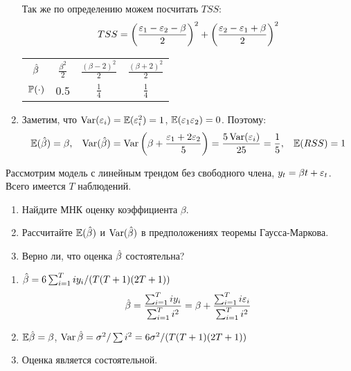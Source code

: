 \begin{problem}
\begin{sol}
\begin{enumerate}
Так же по определению можем посчитать $TSS$:
\[
TSS = \left( \frac{\e_1 -\e_2-\beta}{2} \right)^2 + \left( \frac{\e_2 -\e_1+\beta}{2} \right)^2
\]

\begin{center}
\begin{tabular}{c|ccc}
\toprule
$\hb$ & $ \frac{\beta^2}{2}$ & $\frac{(\beta-2)^2}{2}$ & $\frac{(\beta+2)^2}{2}$\\
$\P(\cdot)$ & 0.5  & $\frac{1}{4}$ & $\frac{1}{4}$\\
\bottomrule
\end{tabular}
\end{center}

\item
Заметим, что $\Var(\e_i) = \E(\e_i^2) = 1$, $\E(\e_1\e_2) = 0$. Поэтому:
\[
\E(\hb) = \beta, \hspace{3mm} \Var(\hb) = \Var\left(\beta + \frac{\e_1 + 2\e_2}{5} \right) = \frac{5\Var(\e_i)}{25} = \frac{1}{5}, \hspace{3mm} \E(RSS) = 1
\]


\end{enumerate}
\end{sol}
\end{problem}




\begin{problem}
Рассмотрим модель с линейным трендом без свободного члена, $y_t=\beta t +\e_t$. Всего имеется $T$ наблюдений.
\begin{enumerate}
\item Найдите МНК оценку коэффициента $\beta$.
\item Рассчитайте $\E(\hb)$ и $\Var(\hb)$ в предположениях теоремы Гаусса-Маркова.
\item Верно ли, что оценка $\hb$ состоятельна?
\end{enumerate}



\begin{sol}
\begin{enumerate}
\item \(\hb = 6 \sum_{i=1}^T i y_i / (T(T+1)(2T+1))\)
\[\hb = \frac{\sum_{i=1}^T i y_i}{\sum_{i=1}^T i^2} = \beta + \frac{\sum_{i=1}^T i \e_i}{\sum_{i=1}^T i^2} \]
\item \(\E\hb = \beta\), \(\Var\hb = \sigma^2 / \sum i^2 = 6\sigma^2 / (T(T+1)(2T+1))\)
\item Оценка является состоятельной.
\end{enumerate}
\end{sol}
\end{problem}





